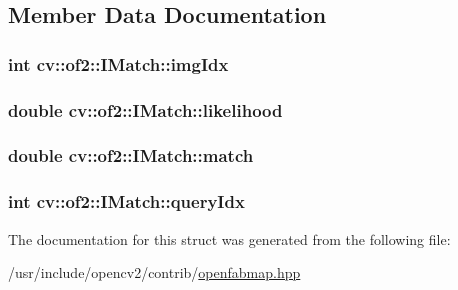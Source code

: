 \subsection{Member Data Documentation}
\hypertarget{structcv_1_1of2_1_1IMatch_a16a6b2213c03216c9ff356b7c7e5261f}{
\subsubsection[{img\-Idx}]{\setlength{\rightskip}{0pt plus 5cm}int cv\-::of2\-::\-I\-Match\-::img\-Idx}}\label{structcv_1_1of2_1_1IMatch_a16a6b2213c03216c9ff356b7c7e5261f}
\hypertarget{structcv_1_1of2_1_1IMatch_ac575fd8f8f6cf87b965572681b7fa86b}{
\subsubsection[{likelihood}]{\setlength{\rightskip}{0pt plus 5cm}double cv\-::of2\-::\-I\-Match\-::likelihood}}\label{structcv_1_1of2_1_1IMatch_ac575fd8f8f6cf87b965572681b7fa86b}
\hypertarget{structcv_1_1of2_1_1IMatch_a5b3f46b8e7a86ae551c287596b751dab}{
\subsubsection[{match}]{\setlength{\rightskip}{0pt plus 5cm}double cv\-::of2\-::\-I\-Match\-::match}}\label{structcv_1_1of2_1_1IMatch_a5b3f46b8e7a86ae551c287596b751dab}
\hypertarget{structcv_1_1of2_1_1IMatch_a380026520adf3bc4f23d88e555c0c416}{
\subsubsection[{query\-Idx}]{\setlength{\rightskip}{0pt plus 5cm}int cv\-::of2\-::\-I\-Match\-::query\-Idx}}\label{structcv_1_1of2_1_1IMatch_a380026520adf3bc4f23d88e555c0c416}


The documentation for this struct was generated from the following file\-:\begin{DoxyCompactItemize}
\item 
/usr/include/opencv2/contrib/\hyperlink{openfabmap_8hpp}{openfabmap.\-hpp}\end{DoxyCompactItemize}
